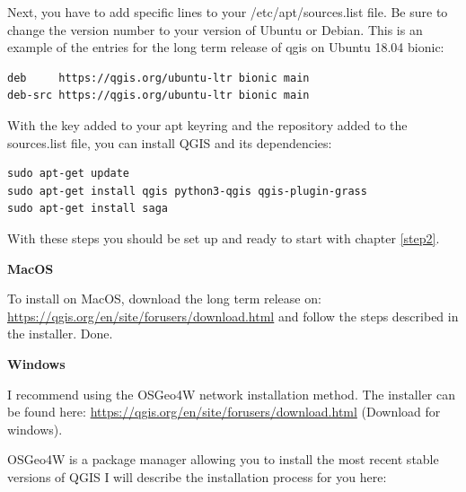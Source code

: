 \documentclass[12pt,a4paper]{scrartcl}
\begin{document}
Next, you have to add specific lines to your /etc/apt/sources.list file.
Be sure to change the version number to your version of Ubuntu or Debian. \newline
This is an example of the entries for the long term release of qgis on Ubuntu 18.04 bionic:

\begin{verbatim}
deb     https://qgis.org/ubuntu-ltr bionic main
deb-src https://qgis.org/ubuntu-ltr bionic main
\end{verbatim}


With the key added to your apt keyring and the repository added to the sources.list file, you can install QGIS and its dependencies:  

\begin{verbatim}
sudo apt-get update
sudo apt-get install qgis python3-qgis qgis-plugin-grass
sudo apt-get install saga
\end{verbatim}

With these steps you should be set up and ready to start with chapter \ref{step2}. \newline

\textbf{MacOS} \newline

To install on MacOS, download the long term release on:
\url{https://qgis.org/en/site/forusers/download.html} and follow the steps described in the installer. Done.\newline

\textbf{Windows} \newline

I recommend using the OSGeo4W network installation method. \newline
The installer can be found here: \url{https://qgis.org/en/site/forusers/download.html} (Download for windows).

OSGeo4W is a package manager allowing you to install the most recent stable versions of QGIS
I will describe the installation process for you here: \newline
\end{document}
